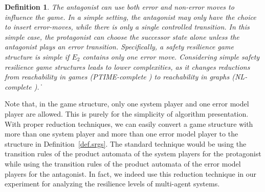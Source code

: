 \documentclass[times,10pt,twocolumn]{article}
\newtheorem{definition}{Definition}
\newcommand\qed{\hfill\ensuremath{\Box}}
\newcommand{\emerr}{\textit{error}}
\newcommand{\emnerr}{\textit{noerr}}
\def\qed{\ifmmode\|\else{\unskip\nobreak\hfil
\penalty50\hskip1em\null\nobreak\hfil$\blacksquare$
\parfillskip=0pt\finalhyphendemerits=0\endgraf}\fi}
\newenvironment{list1}{\begin{list}{$\bullet$}
{\topsep 0 pt \parsep 0 pt \partopsep 0 pt \itemsep 0
pt}}{\end{list}}
\begin{document}
\begin{definition}
The antagonist can use both error and non-error moves to influence the game.
In a simple setting, the antagonist may only have the choice to insert error-moves, while there is only a single controlled transition.
In this simple case, the protagonist can choose the successor state alone unless the antagonist plays an error transition.  
Specifically, a safety resilience game structure is {\em simple} if $E_2$ contains only one error move.
\label{reply1.2.complexities} 
Considering simple safety resilience game structures leads to lower 
complexities, as it changes reductions from reachability in games (PTIME-complete \cite{Immerman81})
to reachability in graphs (NL-complete \cite{Papadimitriou94}).
% 
\qed 
\end{definition} 

Note that, in the game structure, only one system player and one error model player 
are allowed.   
This is purely for the simplicity of algorithm presentation.  
With proper reduction techniques, we can easily convert 
a game structure with more than one system player and 
more than one error model player to the structure in Definition~\ref{def.srgs}.  
The standard technique would be using the transition rules of 
the product automata of the system players for the protagonist while 
using the transition rules of the product automata of the error model players 
for the antagonist.  
In fact, we indeed use this reduction technique in our experiment for 
analyzing the resilience levels of multi-agent systems.  
\end{document}
